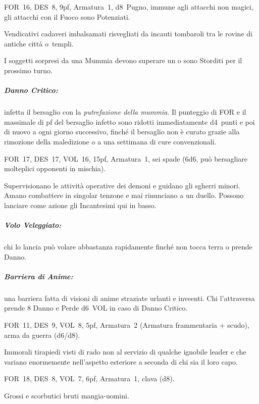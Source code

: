 \documentclass[itdr]{subfiles}
\begin{document}
\vfill

FOR~16, DES~8, 9pf, Armatura~1, d8~Pugno, immune agli attacchi non magici, gli attacchi con il Fuoco sono Potenziati.

Vendicativi cadaveri imbalsamati risvegliati da incauti tombaroli tra le rovine di antiche città o~templi.

I soggetti sorpresi da una Mummia devono superare un  o sono Storditi per il prossimo turno.

\subparagraph{Danno Critico:} infetta il bersaglio con la {\em putrefazione della mummia}. Il punteggio di FOR e il massimale di pf del bersaglio infetto sono ridotti immediatamente d4~punti e poi di nuovo a ogni giorno successivo, finché il bersaglio non è curato grazie alla rimozione della maledizione o a una settimana di cure convenzionali.

\begin{center}
\end{center}

\break

FOR~17, DES~17, VOL~16, 15pf, Armatura~1, sei spade (6d6, può bersagliare molteplici opponenti in mischia).

Supervisionano le attività operative dei demoni e guidano gli sgherri minori. Amano combattere in singolar tenzone e mai rinunciano a un duello. Possono lanciare come azione gli Incantesimi qui in basso.

\subparagraph{Volo Veleggiato:} chi lo lancia può volare abbastanza rapidamente finché non tocca terra o prende Danno.

\subparagraph{Barriera di Anime:} una barriera fatta di visioni di anime straziate urlanti e inveenti. Chi l'attraversa prende 8 Danno e Perde d6~VOL in caso di Danno Critico.

\vfill

FOR~11, DES~9, VOL~8, 5pf, Armatura~2 (Armatura frammentaria + scudo), arma da guerra (d6/d8).

Immorali tirapiedi visti di rado non al servizio di qualche ignobile leader e che variano enormemente nell'aspetto esteriore a seconda di chi sia il loro capo.

\vfill

FOR~18, DES~8, VOL~7, 6pf, Armatura~1, clava (d8).

Grossi e scorbutici bruti mangia-uomini.

\vfill
\end{document}
